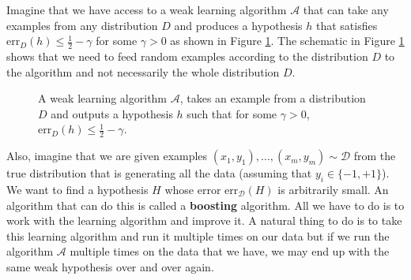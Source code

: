 \documentclass[10pt ]{article}
\begin{document}
Imagine that we have access to a weak learning algorithm $\mathcal{A}$ that can take any examples from any distribution $D$ and produces a hypothesis $h$ that satisfies  $\mathrm{err}_D(h) \le  \frac{1}{2}- \gamma$ for some $\gamma > 0$ as shown in Figure \ref{fig_weak_learner}. The schematic in Figure \ref{fig_weak_learner} shows that we need to feed random examples according to the distribution $D$ to the algorithm and not necessarily the whole distribution $D$.

\begin{figure}
\centering
{}
\caption{A weak learning algorithm $\mathcal{A}$, takes an example from a distribution $D$ and outputs a hypothesis $h$ such that for some $\gamma >0$, $\mathrm{err}_D(h) \le \frac{1}{2} - \gamma$.}
\label{fig_weak_learner}
\end{figure}

Also, imagine that we are given examples $(x_1,y_1),\dots,(x_m,y_m) \sim \mathcal{D}$ from the true distribution that is generating all the data (assuming that $y_i \in \{-1, +1\}$). We want to find a hypothesis $H$ whose error $\mathrm{err}_{\mathcal{D}}(H)$ is arbitrarily small. An algorithm that can do this is called a \textbf{boosting} algorithm. All we have to do is to work with the learning algorithm and improve it. A natural thing to do is to take this learning algorithm and run it multiple times on our data but if we run the algorithm $\mathcal{A}$ multiple times on the data that we have, we may end up with the same weak hypothesis over and over again. 
\end{document}
